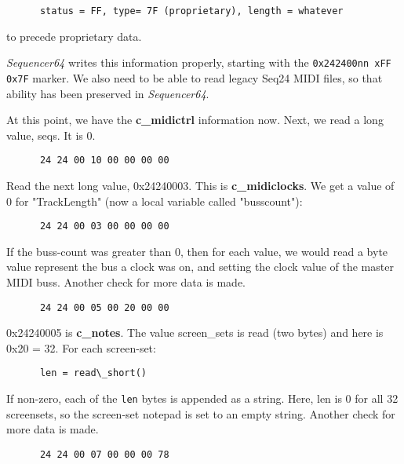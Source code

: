    \begin{verbatim}
      status = FF, type= 7F (proprietary), length = whatever
   \end{verbatim}

   to precede proprietary data.

   \textsl{Sequencer64} writes this information properly,
   starting with the \texttt{0x242400nn xFF 0x7F} marker.
   We also need to be able to read legacy Seq24 MIDI files, so that ability has
   been preserved in \textsl{Sequencer64}.

   At this point, we have the \textbf{c\_midictrl} information now.
   Next, we read a long value, seqs.  It is 0.

   \begin{verbatim}
      24 24 00 10 00 00 00 00
   \end{verbatim}

   Read the next long value, 0x24240003.  This is \textbf{c\_midiclocks}.
   We get a value of 0 for "TrackLength" (now a local variable called
   "busscount"):

   \begin{verbatim}
      24 24 00 03 00 00 00 00
   \end{verbatim}

   If the buss-count was greater than 0, then for each value, we would read a
   byte value represent the bus a clock was on, and setting the clock value
   of the master MIDI buss.
   Another check for more data is made.

   \begin{verbatim}
      24 24 00 05 00 20 00 00
   \end{verbatim}

   0x24240005 is \textbf{c\_notes}.  The value screen\_sets is read (two
   bytes) and
   here is 0x20 = 32.  For each screen-set:

   \begin{verbatim}
      len = read\_short()
   \end{verbatim}

   If non-zero, each of the \texttt{len} bytes is appended as a string.
   Here, len is 0 for all 32 screensets, so the screen-set notepad is set to
   an empty string.
   Another check for more data is made.

   \begin{verbatim}
      24 24 00 07 00 00 00 78
   \end{verbatim}

